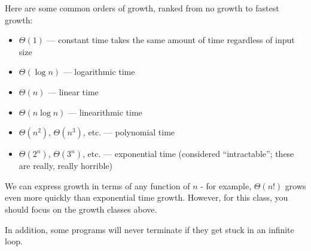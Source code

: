 Here are some common orders of growth, ranked from no growth to fastest growth:
\begin{itemize}
\item $\Theta(1)$ --- constant time takes the same amount of time regardless of
  input size
\item $\Theta(\log n)$ --- logarithmic time
\item $\Theta(n)$ --- linear time
\item $\Theta(n\log n)$ --- linearithmic time
\item $\Theta(n^2)$, $\Theta(n^3)$, etc. --- polynomial time
\item $\Theta(2^n)$, $\Theta(3^n)$, etc. --- exponential time (considered
    ``intractable''; these are really, really horrible)
\end{itemize}

We can express growth in terms of any function of $n$ - for example,
$\Theta(n!)$ grows even more quickly than exponential time growth.
However, for this class, you should focus on the growth classes
above.

In addition, some programs will never terminate if they get stuck in an
infinite loop.
